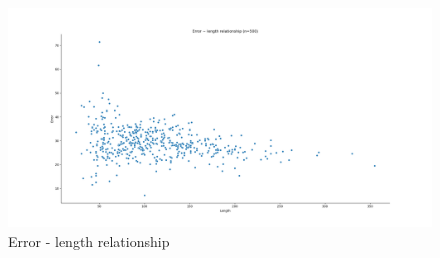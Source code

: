 \begin{figure}
    \centering
    \includegraphics[width=\linewidth]{imgs_andy/error_length_test_set_ensemble_simetrized.png}
    \caption{Error - length relationship}
    \label{fig:err_len}
\end{figure}

